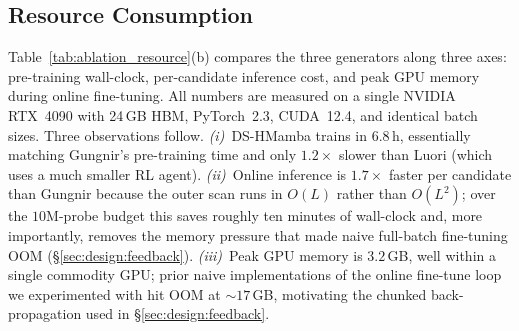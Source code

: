 \documentclass[conference]{IEEEtran}
\begin{document}
\subsection{Resource Consumption}\label{sec:eval:resource}
Table~\ref{tab:ablation_resource}(b) compares the three
generators along three axes: pre-training wall-clock,
per-candidate inference cost, and peak GPU memory during online
fine-tuning.  All numbers are measured on a single NVIDIA
RTX~4090 with 24\,GB HBM, PyTorch~2.3, CUDA~12.4, and identical
batch sizes.  Three observations follow.
\emph{(i)}~DS-HMamba trains in $6.8$\,h, essentially matching
Gungnir's pre-training time and only $1.2\times$ slower than
Luori (which uses a much smaller RL agent).
\emph{(ii)}~Online inference is $1.7\times$ faster per candidate
than Gungnir because the outer scan runs in $O(L)$ rather than
$O(L^2)$; over the $10$M-probe budget this saves roughly ten
minutes of wall-clock and, more importantly, removes the memory
pressure that made naive full-batch fine-tuning OOM
(\S\ref{sec:design:feedback}).
\emph{(iii)}~Peak GPU memory is $3.2$\,GB, well within a single
commodity GPU; prior naive implementations of the online
fine-tune loop we experimented with hit OOM at $\sim\!17$\,GB,
motivating the chunked back-propagation used in
\S\ref{sec:design:feedback}.
\end{document}
